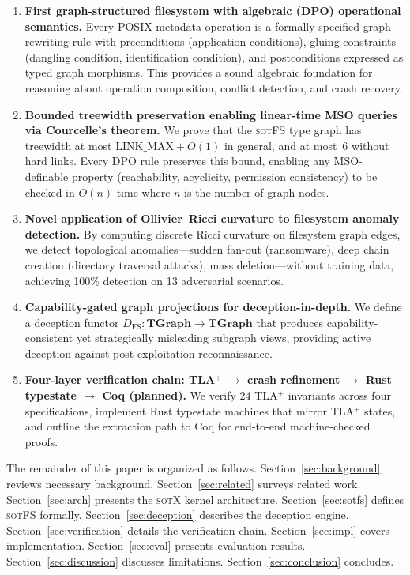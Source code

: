 \documentclass[11pt,a4paper]{article}
\theoremstyle{definition}
\theoremstyle{remark}
\newcommand{\sotfs}{\textsc{sotFS}}
\newcommand{\sotx}{\textsc{sotX}}
\newcommand{\cat}[1]{\ensuremath{\mathbf{#1}}}
\begin{document}
\begin{enumerate}[label=\textbf{C\arabic*}.,leftmargin=2em]
\item \textbf{First graph-structured filesystem with algebraic (DPO)
  operational semantics.} Every POSIX metadata operation is a
  formally-specified graph rewriting rule with preconditions
  (application conditions), gluing constraints (dangling condition,
  identification condition), and postconditions expressed as typed
  graph morphisms. This provides a sound algebraic foundation for
  reasoning about operation composition, conflict detection, and
  crash recovery.

\item \textbf{Bounded treewidth preservation enabling linear-time MSO
  queries via Courcelle's theorem.} We prove that the \sotfs{} type
  graph has treewidth at most $\mathrm{LINK\_MAX} + O(1)$ in general,
  and at most~6 without hard links. Every DPO rule preserves this
  bound, enabling any MSO-definable property (reachability, acyclicity,
  permission consistency) to be checked in $O(n)$ time where $n$ is the
  number of graph nodes.

\item \textbf{Novel application of Ollivier--Ricci curvature to
  filesystem anomaly detection.} By computing discrete Ricci curvature
  on filesystem graph edges, we detect topological anomalies---sudden
  fan-out (ransomware), deep chain creation (directory traversal
  attacks), mass deletion---without training data, achieving 100\%
  detection on 13 adversarial scenarios.

\item \textbf{Capability-gated graph projections for
  deception-in-depth.} We define a deception functor
  $D_{\mathrm{FS}} : \cat{TGraph} \to \cat{TGraph}$ that produces
  capability-consistent yet strategically misleading subgraph views,
  providing active deception against post-exploitation reconnaissance.

\item \textbf{Four-layer verification chain:
  TLA$^+$ $\to$ crash refinement $\to$ Rust typestate $\to$ Coq
  (planned).} We verify 24 TLA$^+$ invariants across four
  specifications, implement Rust typestate machines that mirror TLA$^+$
  states, and outline the extraction path to Coq for end-to-end
  machine-checked proofs.
\end{enumerate}

The remainder of this paper is organized as follows.
Section~\ref{sec:background} reviews necessary background.
Section~\ref{sec:related} surveys related work.
Section~\ref{sec:arch} presents the \sotx{} kernel architecture.
Section~\ref{sec:sotfs} defines \sotfs{} formally.
Section~\ref{sec:deception} describes the deception engine.
Section~\ref{sec:verification} details the verification chain.
Section~\ref{sec:impl} covers implementation.
Section~\ref{sec:eval} presents evaluation results.
Section~\ref{sec:discussion} discusses limitations.
Section~\ref{sec:conclusion} concludes.
\end{document}
